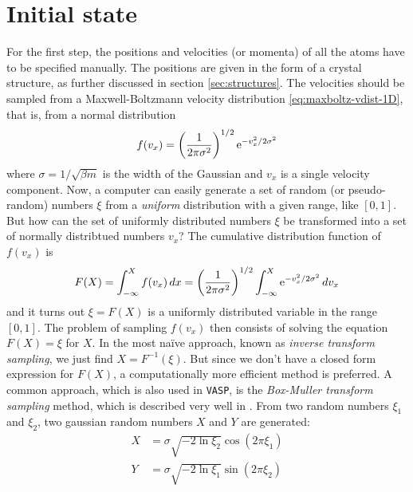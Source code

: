 \documentclass[11pt,bibliography=totoc,index=totoc]{scrbook}   %
\newcommand{\vasp}{{\texttt{VASP}}} %
\begin{document}
\section{Initial state}
%
For the first step, the positions and velocities (or momenta) of all the atoms have to be specified manually. 
The positions are given in the form of a crystal structure, as further discussed in section \ref{sec:structures}.
The velocities should be sampled from a Maxwell-Boltzmann velocity distribution \eqref{eq:maxboltz-vdist-1D},
that is, from a normal distribution
\begin{equation}
    f(v_x) = \left(\frac{1}{2\pi\sigma^2}\right)^{1/2} \mathrm{e}^{-v_x^2/2\sigma^2}
  \label{eq:normal-dist}
\end{equation}
where $\sigma=1/\sqrt{\beta m}$ is the width of the Gaussian and $v_x$ is a single velocity component.
Now, a computer can easily generate a set of random (or pseudo-random) numbers $\xi$ from a \emph{uniform} distribution with a given range, like $[0,1]$.
But how can the set of uniformly distributed numbers $\xi$ be transformed into a set of normally distribtued numbers $v_x$?
The cumulative distribution function of $f(v_x)$ is
\begin{equation}
    F(X) = \int_{-\infty}^X f(v_x)\,dx = \left(\frac{1}{2\pi\sigma^2}\right)^{1/2} \int_{-\infty}^X \mathrm{e}^{-v_x^2/2\sigma^2} \,dv_x
    \label{eq:CDF}
\end{equation}
and it turns out $\xi = F(X)$ is a uniformly distributed variable in the range $[0,1]$. 
The problem of sampling $f(v_x)$ then consists of solving the equation $F(X)=\xi$ for $X$.
In the most naïve approach, known as \emph{inverse transform sampling}, we just find $X=F^{-1}(\xi)$.
But since we don't have a closed form expression for $F(X)$, a computationally more efficient method is preferred. 
A common approach, which is also used in \vasp, is the \emph{Box-Muller transform sampling} method, which is
described very well in \cite[101]{Tuckerman:2010}. 
From two random numbers $\xi_1$ and $\xi_2$, two gaussian random numbers $X$ and $Y$ are generated:
\begin{align}
    X &= \sigma \sqrt{-2\ln\xi_2} \cos(2\pi\xi_1) \\
    Y &= \sigma \sqrt{-2\ln\xi_1} \sin(2\pi\xi_2)
  \label{eq:box-muller-sampling}
\end{align}



%
\end{document}
